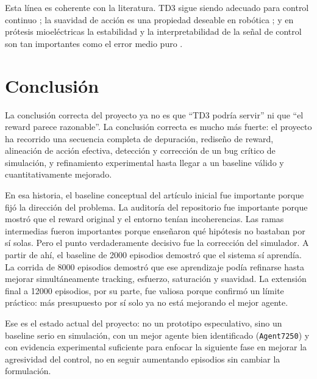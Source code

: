 \documentclass[11pt,a4paper]{article}
\begin{document}
Esta l\'inea es coherente con la literatura. TD3 sigue siendo adecuado para control continuo \citep{fujimoto2018td3,mathworks_td3_agent}; la suavidad de acci\'on es una propiedad deseable en rob\'otica \citep{lee2024smoothness}; y en pr\'otesis mioel\'ectricas la estabilidad y la interpretabilidad de la se\~nal de control son tan importantes como el error medio puro \citep{chen2023review,done2025prostheticrl}.

\section{Conclusi\'on}

La conclusi\'on correcta del proyecto ya no es que ``TD3 podr\'ia servir'' ni que ``el reward parece razonable''. La conclusi\'on correcta es mucho m\'as fuerte: el proyecto ha recorrido una secuencia completa de depuraci\'on, redise\~no de reward, alineaci\'on de acci\'on efectiva, detecci\'on y correcci\'on de un bug cr\'itico de simulaci\'on, y refinamiento experimental hasta llegar a un baseline v\'alido y cuantitativamente mejorado.

En esa historia, el baseline conceptual del art\'iculo inicial \citep{fuertes2026continuous} fue importante porque fij\'o la direcci\'on del problema. La auditor\'ia del repositorio fue importante porque mostr\'o que el reward original y el entorno ten\'ian incoherencias. Las ramas intermedias fueron importantes porque ense\~naron qu\'e hip\'otesis no bastaban por s\'i solas. Pero el punto verdaderamente decisivo fue la correcci\'on del simulador. A partir de ah\'i, el baseline de 2000 episodios demostr\'o que el sistema s\'i aprend\'ia. La corrida de 8000 episodios demostr\'o que ese aprendizaje pod\'ia refinarse hasta mejorar simult\'aneamente tracking, esfuerzo, saturaci\'on y suavidad. La extensi\'on final a 12000 episodios, por su parte, fue valiosa porque confirm\'o un l\'imite pr\'actico: m\'as presupuesto por s\'i solo ya no est\'a mejorando el mejor agente.

Ese es el estado actual del proyecto: no un prototipo especulativo, sino un baseline serio en simulaci\'on, con un mejor agente bien identificado (\texttt{Agent7250}) y con evidencia experimental suficiente para enfocar la siguiente fase en mejorar la agresividad del control, no en seguir aumentando episodios sin cambiar la formulaci\'on.



\end{document}
